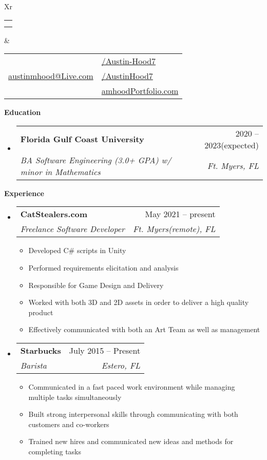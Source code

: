 \documentclass[letterpaper,12pt]{article}[leftmargin=*]
\makeatletter
\def \fullname {Austin Hood}
\def \subtitle {}
\def \linkedinicon {\faLinkedin}
\def \linkedinlink {https://linkedin.com/in/austin-hood7}
\def \linkedintext {/Austin-Hood7}
\def \phoneicon {\faPhone}
\def \phonetext {+1-954-665-7055}
\def \emailicon {\faEnvelope}
\def \emaillink {mailto:austinmhood@live.com}
\def \emailtext {austinmhood@Live.com}
\def \githubicon {\faGithub}
\def \githublink {https://github.com/AustinHood7}
\def \githubtext {/AustinHood7}
\def \websiteicon {\faGlobe}
\def \websitelink {https://amhoodPortfolio.weebly.com/}
\def \websitetext {amhoodPortfolio.com}
\def \headertype {\doublecol} %
\def \entryspacing {-0pt}
\def \linkedin {\linkedinicon \hspace{3pt}\href{\linkedinlink}{\linkedintext}}
\def \phone {\phoneicon \hspace{3pt}{ \phonetext}}
\def \email {\emailicon \hspace{3pt}\href{\emaillink}{\emailtext}}
\def \github {\githubicon \hspace{3pt}\href{\githublink}{\githubtext}}
\def \website {\websiteicon \hspace{3pt}\href{\websitelink}{\websitetext}}
\renewcommand{\section}[2]{\vspace{5pt}
  \colorbox{secondary}{\color{white}\raggedbottom\normalsize\textbf{{#1}{\hspace{7pt}#2}}}
}
\newcommand{\resumeEntryStart}{\begin{itemize}[leftmargin=2.5mm]}
\newcommand{\resumeEntryEnd}{\end{itemize}\vspace{\entryspacing}}
\newcommand{\resumeItemListStart}{\begin{itemize}[leftmargin=4.5mm]}
\newcommand{\resumeItemListEnd}{\end{itemize}}
\newcommand{\resumeItem}[1]{
  \item\small{
    {#1 \vspace{-2pt}}
  }
}
\newcommand{\resumeEntryTSDL}[4]{
  \vspace{-1pt}\item[]
    \begin{tabularx}{0.97\textwidth}{X@{\hspace{60pt}}r}
      \textbf{\color{primary}#1} & {\firabook\color{accent}\small#2} \\
      \textit{\color{accent}\small#3} & \textit{\color{accent}\small#4} \\
    \end{tabularx}\vspace{-6pt}
}
\newcommand{\doublecol}[6]{
  \begin{tabularx}{\textwidth}{Xr}
    {
      \begin{tabular}[c]{l}
        \fontsize{35}{45}\selectfont{\color{primary}{{\textbf{\fullname}}}} \\
        {\textit{\subtitle}} %
      \end{tabular}
    } & {
      \begin{tabular}[c]{l@{\hspace{1.5em}}l}
        {\small#4} & {\small#1} \\
        {\small#5} & {\small#2} \\
        {\small#6} & {\small#3}
      \end{tabular}
    }
  \end{tabularx}
}
\newcommand{\singlecol}[6]{
  \begin{tabularx}{\textwidth}{Xr}
    {
      \begin{tabular}[b]{l}
        \fontsize{35}{45}\selectfont{\color{primary}{{\textbf{\fullname}}}} \\
        {\textit{\subtitle}} %
      \end{tabular}
    } & {
      \begin{tabular}[c]{l}
        {\small#1} \\
        {\small#2} \\
        {\small#3} \\
        {\small#4} \\
        {\small#5} \\
        {\small#6}
      \end{tabular}
    }
  \end{tabularx}
}
\makeatother
\begin{document}


\headertype{\linkedin}{\github}{\website}{\phone}{\email}{} %
\vspace{-10pt} %

\section{\faGraduationCap}{Education}

  \resumeEntryStart
    \resumeEntryTSDL
      {Florida Gulf Coast University}{2020 -- 2023(expected)}
      {BA Software Engineering (3.0+ GPA) w/ minor in Mathematics}{Ft. Myers, FL}
  \resumeEntryEnd

\section{\faPieChart}{Experience}

  \resumeEntryStart
    \resumeEntryTSDL
      {CatStealers.com}{May 2021 -- present}
      {Freelance Software Developer}{Ft. Myers(remote), FL}
    \resumeItemListStart
      \resumeItem {Developed C\# scripts in Unity}
      \resumeItem {Performed requirements elicitation and analysis}
      \resumeItem {Responsible for Game Design and Delivery}
      \resumeItem {Worked with both 3D and 2D assets in order to deliver a high quality product}
      \resumeItem {Effectively communicated with both an Art Team as well as management}
    \resumeItemListEnd
  \resumeEntryEnd
  
  \resumeEntryStart
    \resumeEntryTSDL
      {Starbucks}{July 2015 -- Present}
      {Barista}{Estero, FL}
    \resumeItemListStart
      \resumeItem {Communicated in a fast paced work environment while managing multiple tasks simultaneously}
      \resumeItem {Built strong interpersonal skills through communicating with both customers and co-workers}
      \resumeItem {Trained new hires and communicated new ideas and methods for completing tasks}
    \resumeItemListEnd
  \resumeEntryEnd
\end{document}
